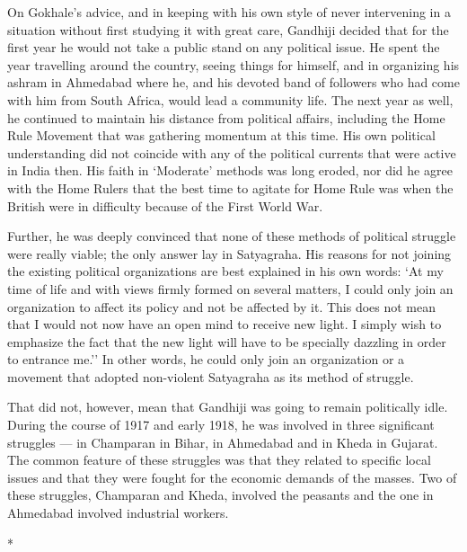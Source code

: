 \begin{multicols}{2}
On Gokhale's advice, and in keeping with his own style of never intervening in a situation without first studying it with great care, Gandhiji decided that for the first year he would not take a public stand on any political issue. He spent the year travelling around the country, seeing things for himself, and in organizing his ashram in Ahmedabad where he, and his devoted band of followers who had come with him from South Africa, would lead a community life. The next year as well, he continued to maintain his distance from political affairs, including the Home Rule Movement that was gathering momentum at this time. His own political understanding did not coincide with any of the political currents that were active in India then. His faith in `Moderate' methods was long eroded, nor did he agree with the Home Rulers that the best time to agitate for Home Rule was when the British were in difficulty because of the First World War.

Further, he was deeply convinced that none of these methods of political struggle were really viable; the only answer lay in Satyagraha. His reasons for not joining the existing political organizations are best explained in his own words: `At my time of life and with views firmly formed on several matters, I could only join an organization to affect its policy and not be affected by it. This does not mean that I would not now have an open mind to receive new light. I simply wish to emphasize the fact that the new light will have to be specially dazzling in order to entrance me.'' In other words, he could only join an organization or a movement that adopted non-violent Satyagraha as its method of struggle.

That did not, however, mean that Gandhiji was going to remain politically idle. During the course of 1917 and early 1918, he was involved in three significant struggles --- in Champaran in Bihar, in Ahmedabad and in Kheda in Gujarat. The common feature of these struggles was that they related to specific local issues and that they were fought for the economic demands of the masses. Two of these struggles, Champaran and Kheda, involved the peasants and the one in Ahmedabad involved industrial workers.

\begin{center}*\end{center}

\paragraph*{}


\end{multicols}
